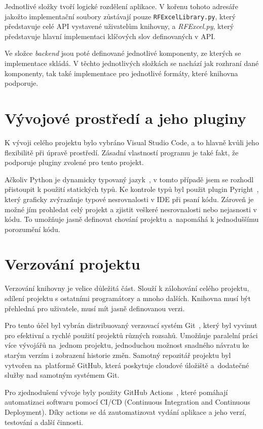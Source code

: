 Jednotlivé složky tvoří logické rozdělení aplikace. V kořenu tohoto adresáře jakožto implementační soubory zůstávají pouze \texttt{RFExcelLibrary.py}, který představuje celé API vystavené uživatelům knihovny, a \textit{RFExcel.py}, který představuje hlavní implementaci klíčových slov definovaných v API.

Ve složce \textit{backend} jsou poté definované jednotlivé komponenty, ze kterých se implementace skládá. V těchto jednotlivých složkách se nachází jak rozhraní dané komponenty, tak také implementace pro jednotlivé formáty, které knihovna podporuje.

\section{Vývojové prostředí a jeho pluginy}

K vývoji celého projektu bylo vybráno Visual Studio Code, a to hlavně kvůli jeho flexibilitě při úpravě prostředí. Zásadní vlastností programu je také fakt, že podporuje pluginy zvolené pro tento projekt. 

Ačkoliv Python je dynamicky typovaný jazyk~\cite{PythonConcepts}, v tomto případě jsem se rozhodl přistoupit k použití statických typů. Ke kontrole typů byl použit plugin Pyright~\cite{Pyright}, který graficky zvýrazňuje typové nesrovnalosti v IDE při psaní kódu. Zároveň je možné jím prohledat celý projekt a zjistit veškeré nesrovnalosti nebo nejasnosti v kódu. To umožňuje jasně definovat chování projektu a~napomáhá k jednoduššímu porozumění kódu.

\section{Verzování projektu}

Verzování knihovny je velice důležitá část. Slouží k zálohování celého projektu, sdílení projektu s ostatními programátory a mnoho dalších. Knihovna musí být přehledná pro uživatele, musí mít jasně definovanou verzi.

Pro tento účel byl vybrán distribuovaný verzovací systém Git~\cite{Git}, který byl vyvinut pro efektivní a rychlé použití projektů různých rozsahů. Umožňuje paralelní práci více vývojářů na~jednom projektu, jednoduchou možnost snadného návratu ke starým verzím i zobrazení historie změn. Samotný repozitář projektu byl vytvořen na~platformě GitHub, která poskytuje cloudové úložiště a~dodatečné služby nad samotným systémem Git.

Pro zjednodušení vývoje byly použity GitHub Actions~\cite{githubActions}, které pomáhají automatizaci softwaru pomocí CI/CD (Continuous Integration and Continuous Deployment). Díky actions se dá zautomatizovat vydání aplikace a jeho verzí, testování a další činnosti.

